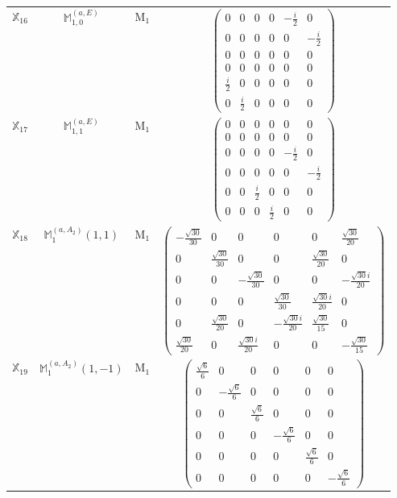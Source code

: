 \documentclass[fleqn,10pt,landscape]{article}
\begin{document}
\begin{itemize}
\begin{center}
\begin{longtable}{c|c|c|c}
$ \mathbb{X}_{16} $ & $\mathbb{M}_{1,0}^{(a,E)}$ & M$_{1}$ & $\begin{pmatrix} 0 & 0 & 0 & 0 & - \frac{i}{2} & 0 \\ 0 & 0 & 0 & 0 & 0 & - \frac{i}{2} \\ 0 & 0 & 0 & 0 & 0 & 0 \\ 0 & 0 & 0 & 0 & 0 & 0 \\ \frac{i}{2} & 0 & 0 & 0 & 0 & 0 \\ 0 & \frac{i}{2} & 0 & 0 & 0 & 0 \end{pmatrix}$ \\
$ \mathbb{X}_{17} $ & $\mathbb{M}_{1,1}^{(a,E)}$ & M$_{1}$ & $\begin{pmatrix} 0 & 0 & 0 & 0 & 0 & 0 \\ 0 & 0 & 0 & 0 & 0 & 0 \\ 0 & 0 & 0 & 0 & - \frac{i}{2} & 0 \\ 0 & 0 & 0 & 0 & 0 & - \frac{i}{2} \\ 0 & 0 & \frac{i}{2} & 0 & 0 & 0 \\ 0 & 0 & 0 & \frac{i}{2} & 0 & 0 \end{pmatrix}$ \\
$ \mathbb{X}_{18} $ & $\mathbb{M}_{1}^{(a,A_{2})}(1,1)$ & M$_{1}$ & $\begin{pmatrix} - \frac{\sqrt{30}}{30} & 0 & 0 & 0 & 0 & \frac{\sqrt{30}}{20} \\ 0 & \frac{\sqrt{30}}{30} & 0 & 0 & \frac{\sqrt{30}}{20} & 0 \\ 0 & 0 & - \frac{\sqrt{30}}{30} & 0 & 0 & - \frac{\sqrt{30} i}{20} \\ 0 & 0 & 0 & \frac{\sqrt{30}}{30} & \frac{\sqrt{30} i}{20} & 0 \\ 0 & \frac{\sqrt{30}}{20} & 0 & - \frac{\sqrt{30} i}{20} & \frac{\sqrt{30}}{15} & 0 \\ \frac{\sqrt{30}}{20} & 0 & \frac{\sqrt{30} i}{20} & 0 & 0 & - \frac{\sqrt{30}}{15} \end{pmatrix}$ \\
$ \mathbb{X}_{19} $ & $\mathbb{M}_{1}^{(a,A_{2})}(1,-1)$ & M$_{1}$ & $\begin{pmatrix} \frac{\sqrt{6}}{6} & 0 & 0 & 0 & 0 & 0 \\ 0 & - \frac{\sqrt{6}}{6} & 0 & 0 & 0 & 0 \\ 0 & 0 & \frac{\sqrt{6}}{6} & 0 & 0 & 0 \\ 0 & 0 & 0 & - \frac{\sqrt{6}}{6} & 0 & 0 \\ 0 & 0 & 0 & 0 & \frac{\sqrt{6}}{6} & 0 \\ 0 & 0 & 0 & 0 & 0 & - \frac{\sqrt{6}}{6} \end{pmatrix}$ \\

\end{longtable}
\end{center}
\end{itemize}
\end{document}
